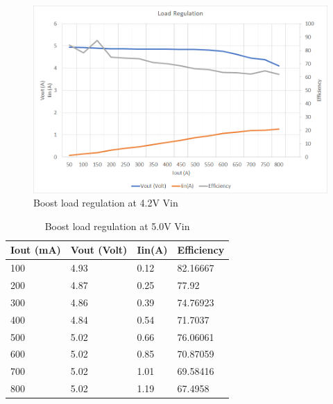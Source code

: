 \\ 
\begin{figure}[H]
	\centering
	\includegraphics[width=\columnwidth]{IMGS/Boost load regulation at 4.2V Vin.png}
	\caption{Boost load regulation at 4.2V Vin}
	\label{fig:arch}
\end{figure}
\begin{table}[H]
\centering
\begin{tabular}{|l|l|l|l|}
\hline
Iout (mA) & Vout (Volt) & Iin(A) & Efficiency \\ \hline
100       & 4.93        & 0.12   & 82.16667   \\ \hline
200       & 4.87        & 0.25   & 77.92      \\ \hline
300       & 4.86        & 0.39   & 74.76923   \\ \hline
400       & 4.84        & 0.54   & 71.7037    \\ \hline
500       & 5.02        & 0.66   & 76.06061   \\ \hline
600       & 5.02        & 0.85   & 70.87059   \\ \hline
700       & 5.02        & 1.01   & 69.58416   \\ \hline
800       & 5.02        & 1.19   & 67.4958    \\ \hline
\end{tabular}
\caption{Boost load regulation at 5.0V Vin}
\label{table:4}
\end{table}
\\
